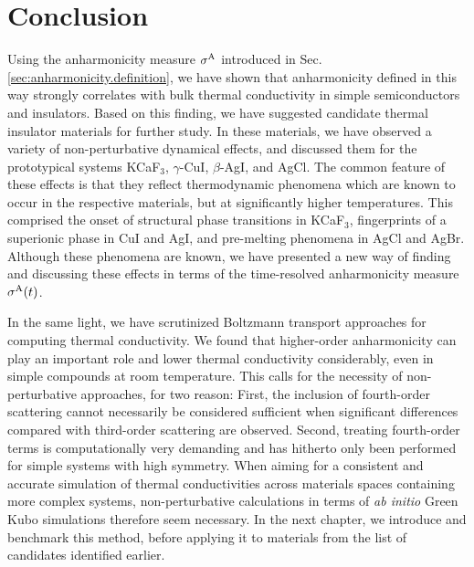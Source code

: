 


\section{Conclusion}

Using the anharmonicity measure $\sigma^\mathrm{A}$ introduced in Sec.\,\ref{sec:anharmonicity.definition}, we have shown that anharmonicity defined in this way strongly correlates with bulk thermal conductivity in simple semiconductors and insulators. Based on this finding, we have suggested candidate thermal insulator materials for further study. In these materials, we have observed a variety of non-perturbative dynamical effects, and discussed them for the prototypical systems KCaF$_3$, $\gamma$-CuI, $\beta$-AgI, and AgCl. The common feature of these effects is that they reflect thermodynamic phenomena which are known to occur in the respective materials, but at significantly higher temperatures. This comprised the onset of structural phase transitions in KCaF$_3$, fingerprints of a superionic phase in CuI and AgI, and pre-melting phenomena in AgCl and AgBr. Although these phenomena are known, we have presented a new way of finding and discussing these effects in terms of the time-resolved anharmonicity measure $\sigma^\mathrm{A} (t)$.

In the same light, we have scrutinized Boltzmann transport approaches for computing thermal conductivity. We found that higher-order anharmonicity can play an important role and lower thermal conductivity considerably, even in simple compounds at room temperature. This calls for the necessity of non-perturbative approaches, for two reason: First, the inclusion of fourth-order scattering cannot necessarily be considered sufficient when significant differences compared with third-order scattering are observed. Second, treating fourth-order terms is computationally very demanding and has hitherto only been performed for simple systems with high symmetry. When aiming for a consistent and accurate simulation of thermal conductivities across materials spaces containing more complex systems, non-perturbative calculations in terms of \emph{ab initio} Green Kubo simulations therefore seem necessary. In the next chapter, we introduce and benchmark this method, before applying it to materials from the list of candidates identified earlier.

